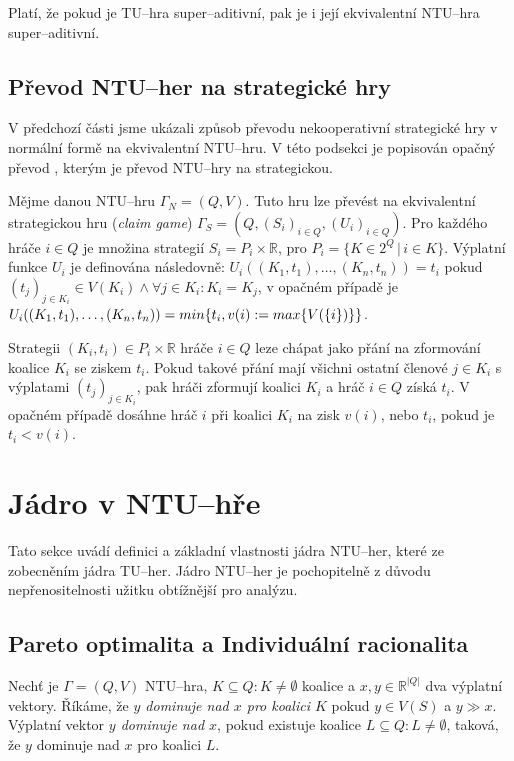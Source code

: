             Platí, že pokud je TU--hra super--aditivní, pak je i její ekvivalentní NTU--hra super--aditivní.

    \subsection{Převod NTU--her na strategické hry}
        V předchozí části jsme ukázali způsob převodu nekooperativní strategické hry v normální formě na ekvivalentní NTU--hru. V této podsekci je popisován opačný převod \cite{NTU2STR}, kterým je převod NTU--hry na strategickou.

        Mějme danou NTU--hru $\Gamma_N = (Q, V)$. Tuto hru lze převést na ekvivalentní strategickou hru (\textit{claim game}) $\Gamma_S = (Q, (S_i)_{i\in Q}, (U_i)_{i \in Q})$. Pro každého hráče $i \in Q$ je množina strategií $S_i = P_i \times \mathbb{R}$, pro $P_i = \{K \in 2^Q\,|\, i \in K\}$. Výplatní funkce $U_i$ je definována následovně: $U_i((K_1, t_1), \dots, (K_n, t_n)) = t_i$ pokud $(t_j)_{j\in K_i} \in V(K_i) \land \forall j \in K_i: K_i = K_j$, v opačném případě je $U_i((K_1, t_1), \dots,\\ (K_n, t_n)) = min\{t_i, v(i) := max\{V(\{i\})\}\}$.

        Strategii $(K_i, t_i) \in P_i \times \mathbb{R}$ hráče $i \in Q$ leze chápat jako přání na zformování koalice $K_i$ se ziskem $t_i$. Pokud takové přání mají všichni ostatní členové $j \in K_i$ s výplatami $(t_j)_{j\in K_i}$, pak hráči zformují koalici $K_i$ a hráč $i \in Q$ získá $t_i$. V opačném případě dosáhne hráč $i$ při koalici $K_i$ na zisk $v(i)$, nebo $t_i$, pokud je $t_i < v(i)$.

\section{Jádro v NTU--hře}
    \label{sec:Core}
    Tato sekce uvádí definici a základní vlastnosti jádra NTU--her, které ze zobecněním jádra TU--her. Jádro NTU--her je pochopitelně z důvodu nepřenositelnosti užitku obtížnější pro analýzu.

    \subsection{Pareto optimalita a Individuální racionalita}
        Nechť je $\Gamma = (Q, V)$ NTU--hra, $K \subseteq Q: K \neq \emptyset$ koalice a $x, y \in \mathbb{R}^{|Q|}$ dva výplatní vektory. Říkáme, že \textit{$y$ dominuje nad $x$ pro koalici $K$} pokud $y \in V(S)$ a $y \gg x$. Výplatní vektor \textit{$y$ dominuje nad $x$}, pokud existuje koalice $L \subseteq Q: L \neq \emptyset$, taková, že $y$ dominuje nad $x$ pro koalici $L$.

